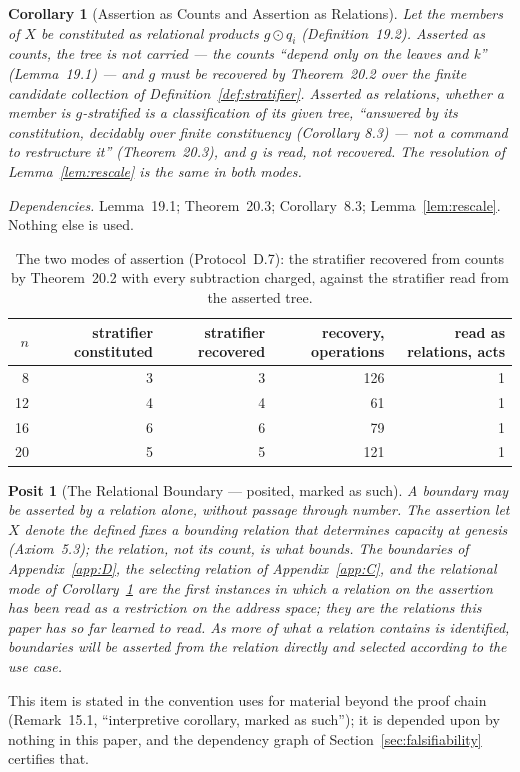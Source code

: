 \documentclass[pdflatex,sn-mathphys-num]{sn-jnl}
\theoremstyle{thmstyleone}%
\newtheorem{corollary}[theorem]{Corollary}
\newtheorem{posit}[theorem]{Posit}
\theoremstyle{thmstyletwo}%
\theoremstyle{thmstylethree}%
\newtheorem{corollary}[theorem]{Corollary}
\newtheorem{posit}[theorem]{Posit}
\newcommand{\PA}{\cite{Swanagon2026PA}}
\newcommand{\q}[1]{``#1''}        %
\newcommand{\deps}[1]{\par\begin{sloppypar}\noindent\emph{Dependencies.} #1 Nothing else is used.\end{sloppypar}}
\begin{document}
\begin{corollary}[Assertion as Counts and Assertion as Relations]\label{cor:modes}
Let the members of $X$ be constituted as relational products $g\odot q_i$ (Definition~19.2). Asserted as counts, the tree is not carried --- the counts \q{depend only on the leaves and k} (Lemma~19.1) --- and $g$ must be recovered by Theorem~20.2 over the finite candidate collection of Definition~\ref{def:stratifier}. Asserted as relations, whether a member is $g$-stratified is a classification of its given tree, \q{answered by its constitution, decidably over finite constituency (Corollary 8.3) — not a command to restructure it} (Theorem~20.3), and $g$ is read, not recovered. The resolution of Lemma~\ref{lem:rescale} is the same in both modes.
\end{corollary}
\deps{Lemma~19.1; Theorem~20.3; Corollary~8.3; Lemma~\ref{lem:rescale}.}

\begin{table}[!htbp]
\centering\small
\caption{The two modes of assertion (Protocol~D.7): the stratifier recovered from counts by Theorem~20.2 with every subtraction charged, against the stratifier read from the asserted tree.}
\label{tab:modes}
\begin{tabular}{rrrrr}
\toprule
$n$ & stratifier constituted & stratifier recovered & recovery, operations & read as relations, acts \\
\midrule
8 & 3 & 3 & 126 & 1 \\
12 & 4 & 4 & 61 & 1 \\
16 & 6 & 6 & 79 & 1 \\
20 & 5 & 5 & 121 & 1 \\
\bottomrule
\end{tabular}
\end{table}

\begin{posit}[The Relational Boundary --- posited, marked as such]\label{pos:relational}
A boundary may be asserted by a relation alone, without passage through number. The assertion \emph{let $X$ denote the defined} fixes a bounding relation that determines capacity at genesis (Axiom~5.3); the relation, not its count, is what bounds. The boundaries of Appendix~\ref{app:D}, the selecting relation of Appendix~\ref{app:C}, and the relational mode of Corollary~\ref{cor:modes} are the first instances in which a relation on the assertion has been read as a restriction on the address space; they are the relations this paper has so far learned to read. As more of what a relation contains is identified, boundaries will be asserted from the relation directly and selected according to the use case.
\end{posit}
\noindent This item is stated in the convention \PA{} uses for material beyond the proof chain (Remark~15.1, \q{interpretive corollary, marked as such}); it is depended upon by nothing in this paper, and the dependency graph of Section~\ref{sec:falsifiability} certifies that.
\end{document}

